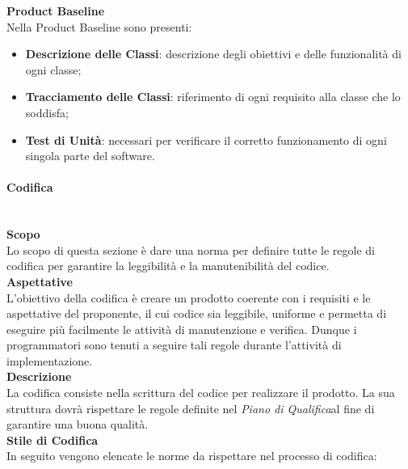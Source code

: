 \textbf{Product Baseline}\\
Nella Product Baseline sono presenti:
\begin{itemize}
	\item \textbf{Descrizione delle Classi}: descrizione degli obiettivi e delle funzionalità di ogni classe;
	\item \textbf{Tracciamento delle Classi}: riferimento di ogni requisito alla classe che lo soddisfa;
	\item \textbf{Test di Unità}: necessari per verificare il corretto funzionamento di ogni singola parte del software.
\end{itemize}
\paragraph{Codifica}\mbox{}\\ [1mm]
\textbf{Scopo}\\
Lo scopo di questa sezione è dare una norma per definire tutte le regole di codifica per garantire la leggibilità e la manutenibilità del codice.
\\\textbf{Aspettative}\\
L'obiettivo della codifica è creare un prodotto coerente con i requisiti e le aspettative del proponente, il cui codice sia leggibile, uniforme e permetta di eseguire più facilmente le attività di manutenzione e verifica. Dunque i programmatori sono tenuti a seguire tali regole durante l'attività di implementazione.
\\\textbf{Descrizione}\\
La codifica consiste nella scrittura del codice per realizzare il prodotto. La sua struttura dovrà rispettare le regole definite nel \textit{Piano di Qualifica}al fine di garantire una buona qualità.
\\\textbf{Stile di Codifica}\\
In seguito vengono elencate le norme da rispettare nel processo di codifica:
